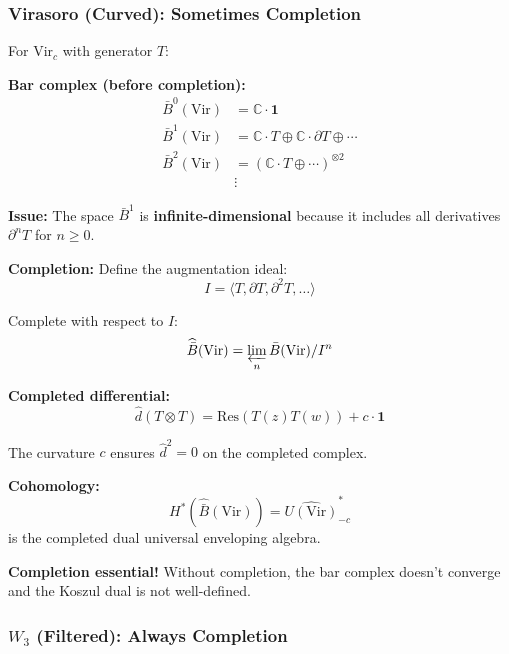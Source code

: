 \subsubsection{Virasoro (Curved): Sometimes Completion}

\begin{example}\label{ex:vir-bar-completion}
For $\text{Vir}_c$ with generator $T$:

\textbf{Bar complex (before completion):}
\begin{align}
\bar{B}^0(\text{Vir}) &= \mathbb{C} \cdot \mathbf{1} \\
\bar{B}^1(\text{Vir}) &= \mathbb{C} \cdot T \oplus \mathbb{C} \cdot \partial T \oplus \cdots \\
\bar{B}^2(\text{Vir}) &= (\mathbb{C} \cdot T \oplus \cdots)^{\otimes 2} \\
&\vdots
\end{align}

\textbf{Issue:} The space $\bar{B}^1$ is \textbf{infinite-dimensional} because it includes 
all derivatives $\partial^n T$ for $n \geq 0$.

\textbf{Completion:} Define the augmentation ideal:
$$I = \langle T, \partial T, \partial^2 T, \ldots \rangle$$

Complete with respect to $I$:
$$\widehat{\bar{B}}(\text{Vir}) = \varprojlim_n \bar{B}(\text{Vir})/I^n$$

\textbf{Completed differential:}
$$\widehat{d}(T \otimes T) = \text{Res}(T(z)T(w)) + c \cdot \mathbf{1}$$

The curvature $c$ ensures $\widehat{d}^2 = 0$ on the completed complex.

\textbf{Cohomology:}
$$H^*(\widehat{\bar{B}}(\text{Vir})) = \widehat{U(\text{Vir})}^*_{-c}$$
is the completed dual universal enveloping algebra.

\textbf{Completion essential!} Without completion, the bar complex doesn't converge and the 
Koszul dual is not well-defined.
\end{example}

\subsubsection{$W_3$ (Filtered): Always Completion}

